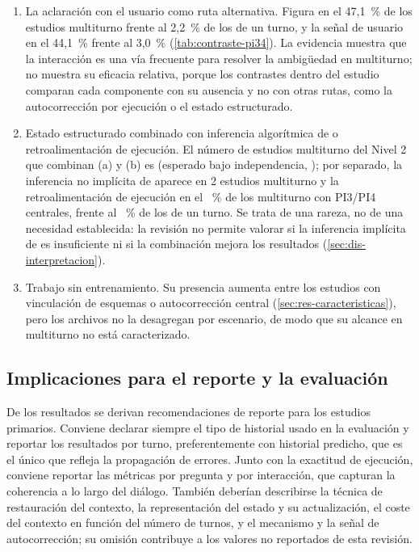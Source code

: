 \begin{enumerate}
  \item La aclaración con el usuario como ruta alternativa. Figura en el 47,1~\% de los estudios multiturno frente al 2,2~\% de los de un turno, y la señal de usuario en el 44,1~\% frente al 3,0~\% (\cref{tab:contraste-pi34}). La evidencia muestra que la interacción es una vía frecuente para resolver la ambigüedad en multiturno; no muestra su eficacia relativa, porque los contrastes dentro del estudio comparan cada componente con su ausencia y no con otras rutas, como la autocorrección por ejecución o el estado estructurado.
  \item Estado estructurado combinado con inferencia algorítmica de  o retroalimentación de ejecución. El número de estudios multiturno del Nivel 2 que combinan (a) y (b) es \nMochoAB{} (esperado bajo independencia, \espMochoAB{}); por separado, la inferencia no implícita de  aparece en 2 estudios multiturno y la retroalimentación de ejecución en el \ctMecEjecucionFeedbackErroresMT{}~\% de los multiturno con PI3/PI4 centrales, frente al \ctMecEjecucionFeedbackErroresUT{}~\% de los de un turno. Se trata de una rareza, no de una necesidad establecida: la revisión no permite valorar si la inferencia implícita de  es insuficiente ni si la combinación mejora los resultados (\cref{sec:dis-interpretacion}).
  \item Trabajo sin entrenamiento. Su presencia aumenta entre los estudios con vinculación de esquemas o autocorrección central (\cref{sec:res-caracteristicas}), pero los archivos no la desagregan por escenario, de modo que su alcance en multiturno no está caracterizado.
\end{enumerate}

\subsection{Implicaciones para el reporte y la evaluación}
\label{sec:dis-practica}

De los resultados se derivan recomendaciones de reporte para los estudios primarios. Conviene declarar siempre el tipo de historial usado en la evaluación y reportar los resultados por turno, preferentemente con historial predicho, que es el único que refleja la propagación de errores. Junto con la exactitud de ejecución, conviene reportar las métricas por pregunta y por interacción, que capturan la coherencia a lo largo del diálogo. También deberían describirse la técnica de restauración del contexto, la representación del estado y su actualización, el coste del contexto en función del número de turnos, y el mecanismo y la señal de autocorrección; su omisión contribuye a los valores no reportados de esta revisión.

